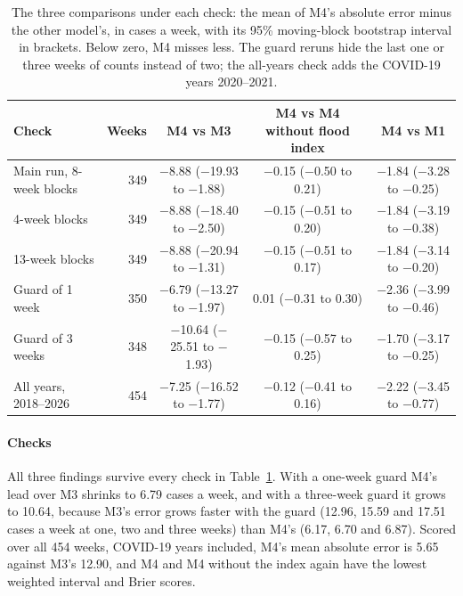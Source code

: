\begin{table}[t]
\centering\footnotesize
\setlength{\tabcolsep}{4.5pt}
\caption{The three comparisons under each check: the mean of M4's absolute error minus the
other model's, in cases a week, with its 95\% moving-block bootstrap interval in brackets.
Below zero, M4 misses less. The guard reruns hide the last one or three weeks of counts instead
of two; the all-years check adds the COVID-19 years 2020--2021.}\label{tab:robustness}
\begin{tabular}{@{}l r ccc@{}}
\toprule
\textbf{Check} & \textbf{Weeks} & \textbf{M4 vs M3} & \textbf{M4 vs M4 without flood index}
 & \textbf{M4 vs M1} \\
\midrule
Main run, 8-week blocks & 349 & $-$8.88 ($-$19.93 to $-$1.88) & $-$0.15 ($-$0.50 to 0.21) & $-$1.84 ($-$3.28 to $-$0.25) \\
4-week blocks & 349 & $-$8.88 ($-$18.40 to $-$2.50) & $-$0.15 ($-$0.51 to 0.20) & $-$1.84 ($-$3.19 to $-$0.38) \\
13-week blocks & 349 & $-$8.88 ($-$20.94 to $-$1.31) & $-$0.15 ($-$0.51 to 0.17) & $-$1.84 ($-$3.14 to $-$0.20) \\
Guard of 1 week & 350 & $-$6.79 ($-$13.27 to $-$1.97) & 0.01 ($-$0.31 to 0.30) & $-$2.36 ($-$3.99 to $-$0.46) \\
Guard of 3 weeks & 348 & $-$10.64 ($-$25.51 to $-$1.93) & $-$0.15 ($-$0.57 to 0.25) & $-$1.70 ($-$3.17 to $-$0.25) \\
All years, 2018--2026 & 454 & $-$7.25 ($-$16.52 to $-$1.77) & $-$0.12 ($-$0.41 to 0.16) & $-$2.22 ($-$3.45 to $-$0.77) \\
\bottomrule
\end{tabular}
\end{table}

\paragraph{Checks}\label{sec:results-checks}
All three findings survive every check in Table~\ref{tab:robustness}. With a one-week guard M4's
lead over M3 shrinks to 6.79 cases a week, and with a three-week guard it grows to 10.64,
because M3's error grows faster with the guard (12.96, 15.59 and 17.51 cases a week at one, two
and three weeks) than M4's (6.17, 6.70 and 6.87). Scored over all 454 weeks, COVID-19 years
included, M4's mean absolute error is 5.65 against M3's 12.90, and M4 and M4 without the index
again have the lowest weighted interval and Brier scores.

